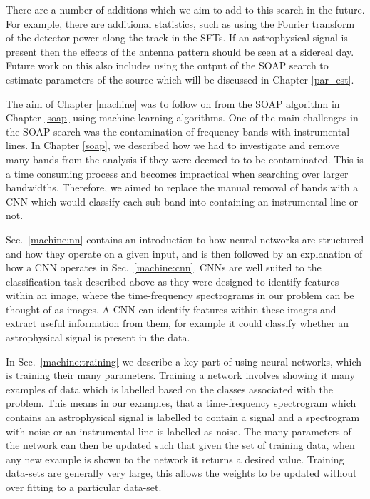 There are a number of additions which we aim to add to this search in the future. 
For example, there are additional statistics, such as using the Fourier transform of the detector power along the track in the \glspl{SFT}. 
If an astrophysical signal is present then the effects of the antenna pattern should be seen at a sidereal day.
Future work on this also includes using the output of the SOAP search to estimate parameters of the source which will be discussed in Chapter \ref{par_est}. 

\bigskip

The aim of Chapter \ref{machine} was to follow on from the SOAP algorithm in Chapter \ref{soap} using machine learning algorithms.
One of the main challenges in the SOAP search was the contamination of frequency bands with instrumental lines.
In Chapter \ref{soap}, we described how we had to investigate and remove many bands from the analysis if they were deemed to to be contaminated.
This is a time consuming process and becomes impractical when searching over larger bandwidths.
Therefore, we aimed to replace the manual removal of bands with a \gls{CNN} which would classify each sub-band into containing an instrumental line or not.

Sec.~\ref{machine:nn} contains an introduction to how neural networks are structured and how they operate on a given input, and is then followed by an explanation of how a \gls{CNN} operates in Sec.~\ref{machine:cnn}.
\glspl{CNN} are well suited to the classification task described above as they were designed to identify features within an image, where the time-frequency spectrograms in our problem can be thought of as images.
A \gls{CNN} can identify features within these images and extract useful information from them, for example it could classify whether an astrophysical signal is present in the data.

In Sec.~\ref{machine:training} we describe a key part of using neural networks, which is training their many parameters.
Training a network involves showing it many examples of data which is labelled based on the classes associated with the problem.
This means in our examples, that a time-frequency spectrogram which contains an astrophysical signal is labelled to contain a signal and a spectrogram with noise or an instrumental line is labelled as noise.
The many parameters of the network can then be updated such that given the set of training data, when any new example is shown to the network it returns a desired value.
Training data-sets are generally very large, this allows the weights to be updated without over fitting to a particular data-set. 

